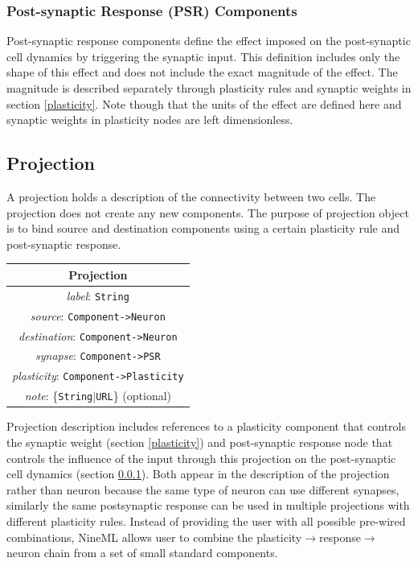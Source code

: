 \documentclass{article}
\begin{document}
\subsubsection{Post-synaptic Response (PSR) Components}
\label{secSynapse}

Post-synaptic response components define the effect imposed on the
post-synaptic cell dynamics by triggering the synaptic input. This
definition includes only the shape of this effect and does not include the
exact magnitude of the effect. The magnitude is described separately through
plasticity rules and synaptic weights in section \ref{plasticity}. Note
though that the units of the effect are defined here and synaptic weights in
plasticity nodes are left dimensionless.

\subsection{Projection}
\label{projections}

A projection holds a description of the connectivity between two
cells. The projection does not create any new components. The purpose of
projection object is to bind source and destination components using
a certain plasticity rule and post-synaptic response.

\begin{table}[htb]
\center
\begin{tabular}{|c|}
\hline
\hline
Projection \\
\hline
\hline
{\em label}: {\tt String} \\
\hline
{\em source}: {\tt Component->Neuron} \\
\hline
{\em destination}: {\tt Component->Neuron} \\
\hline
{\em synapse}: {\tt Component->PSR} \\
\hline
{\em plasticity}: {\tt Component->Plasticity} \\
\hline
{\em note}: \{{\tt String}$|${\tt URL}\} (optional)\\
\hline
\end{tabular}
\end{table}

Projection description includes references to a plasticity component
that controls the synaptic weight (section \ref{plasticity}) and
post-synaptic response node that controls the influence of the input
through this projection on the post-synaptic cell dynamics (section
\ref{secSynapse}). Both appear in the description of the projection
rather than neuron because the same type of neuron can use different
synapses, similarly the same postsynaptic response can be used in
multiple projections with different plasticity rules. Instead of providing
the user with all possible pre-wired combinations, NineML allows user
to combine the plasticity$\rightarrow$response$\rightarrow$neuron
chain from a set of small standard components.
\end{document}
